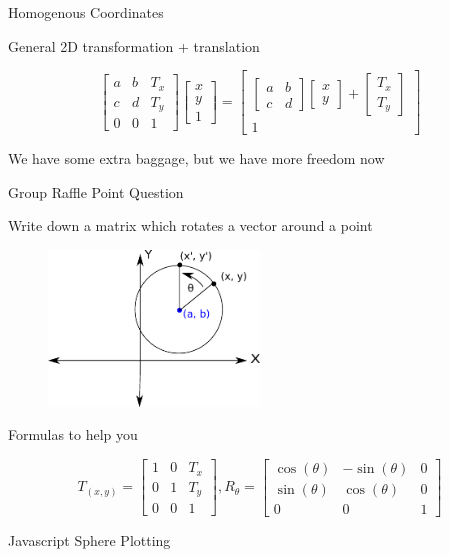 \documentclass{beamer}
\begin{document}
\begin{frame}{Homogenous Coordinates}

General 2D transformation + translation

\[ \left[ \begin{array}{ccc} a & b & T_x \\ c & d & T_y \\ 0 & 0 & 1 \end{array} \right] \left[ \begin{array}{c} x \\ y \\ 1 \end{array} \right] = \left[  \begin{array}{c} \left[ \begin{array}{cc} a & b \\ c & d \end{array} \right] \left[ \begin{array}{c} x \\ y \end{array} \right] + \left[ \begin{array}{c} T_x \\ T_y \end{array} \right]  \\ 1 \end{array}  \right] \]

We have some extra baggage, but we have more freedom now

\end{frame}

\begin{frame}{Group Raffle Point Question}

Write down a matrix which rotates a vector around a point

\begin{figure}[t]
	\centering
    \includegraphics[width=0.5\textwidth]{RotateAroundPoint.pdf}
\end{figure}

Formulas to help you

\[ T_{(x, y)} = \left[ \begin{array}{ccc} 1 & 0 & T_x \\ 0 & 1 & T_y \\ 0 & 0 & 1 \end{array} \right], R_{\theta} = \left[ \begin{array}{ccc} \cos(\theta) & -\sin(\theta) & 0 \\ \sin(\theta) & \cos(\theta) & 0 \\ 0 & 0 & 1 \end{array} \right] \]

\end{frame}


\begin{frame}{Javascript Sphere Plotting}

\end{frame}
\end{document}
